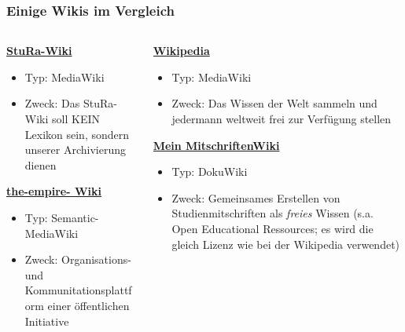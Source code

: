 \documentclass{beamer}              %
\begin{document}
\begin{frame}
  \frametitle{Einige Wikis im Vergleich}
  \begin{columns}
    \begin{column}{0.5\linewidth}
      \textbf{\href{http://wiki.stura.htw-dresden.de}{StuRa-Wiki}}
      \begin{itemize}
        \item Typ: MediaWiki
        \item Zweck: Das StuRa-Wiki soll KEIN Lexikon sein, sondern unserer Archivierung dienen
      \end{itemize}

      \textbf{\href{http://www.the-empire.de}{the-empire- Wiki}}
      \begin{itemize}
        \item Typ: Semantic-MediaWiki
        \item Zweck: Organisations- und Kommunitationsplattform einer öffentlichen Initiative \\ 
      \end{itemize}
    \end{column}
    \begin{column}{0.5\linewidth}

      \textbf{\href{http://www.wikipedia.de}{Wikipedia}}
      \begin{itemize}
        \item Typ: MediaWiki
        \item Zweck: Das Wissen der Welt sammeln und jedermann weltweit frei zur Verfügung stellen
      \end{itemize}

      \textbf{\href{http://www2.htw-dresden.de/~s70341/cgi-bin/dokuwiki/doku.php}{Mein MitschriftenWiki}}
      \begin{itemize}
        \item Typ: DokuWiki
        \item Zweck: Gemeinsames Erstellen von Studienmitschriften als \emph{freies} Wissen (s.a.  Open Educational Ressources; es wird die gleich Lizenz wie bei der Wikipedia verwendet)
      \end{itemize}

    \end{column}
  \end{columns}
\end{frame}
\end{document}
